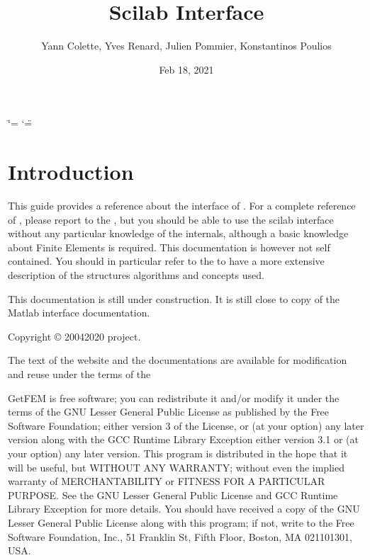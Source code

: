 \documentclass[a4paper,11pt,english]{sphinxmanual}
\title{Scilab Interface}
\date{Feb 18, 2021}
\author{Yann Colette, Yves Renard, Julien Pommier, Konstantinos Poulios}
\begin{document}
\ifdefined\shorthandoff
  \ifnum\catcode`\=\string=\active\shorthandoff{=}\fi
  \ifnum\catcode`\"=\active{}\fi
\fi

\pagestyle{empty}
\sphinxmaketitle
\pagestyle{plain}
\sphinxtableofcontents
\pagestyle{normal}
\label{\detokenize{scilab/index::doc}}



\chapter{Introduction}
\label{\detokenize{scilab/intro:introduction}}\label{\detokenize{scilab/intro::doc}}
\sphinxAtStartPar
This guide provides a reference about the  interface of . For a complete
reference of , please report to the , but you should be
able to use the scilab interface without any particular knowledge of the 
internals, although a basic knowledge about Finite Elements is required.
This documentation is however not self contained. You should in
particular refer to the  to have a more extensive
description of the structures algorithms and concepts used.

\sphinxAtStartPar
This documentation is still under construction. It is still close to copy of the Matlab interface documentation.

\sphinxAtStartPar
Copyright © 2004\sphinxhyphen{}2020  project.

\sphinxAtStartPar
The text of the  website and the documentations are available for modification and reuse under the terms of the 

\sphinxAtStartPar
GetFEM  is  free software;  you  can  redistribute  it  and/or modify it
under  the  terms  of the  GNU  Lesser General Public License as published
by  the  Free Software Foundation;  either version 3 of the License,  or
(at your option) any later version along with the GCC Runtime Library
Exception either version 3.1 or (at your option) any later version.
This program  is  distributed  in  the  hope  that it will be useful,  but
WITHOUT ANY WARRANTY; without even the implied warranty of MERCHANTABILITY
or  FITNESS  FOR  A PARTICULAR PURPOSE.  See the GNU Lesser General Public
License and GCC Runtime Library Exception for more details.
You  should  have received a copy of the GNU Lesser General Public License
along  with  this program;  if not, write to the Free Software Foundation,
Inc., 51 Franklin St, Fifth Floor, Boston, MA  02110\sphinxhyphen{}1301, USA.
\end{document}
